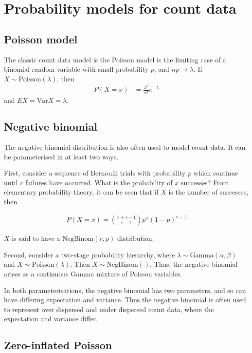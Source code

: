 \documentclass{amsart}
\begin{document}
\section{Probability models for count data}
\subsection{Poisson model}
The classic count data model is the Poisson model is the limiting case of a binomial 
random variable with small  probability $p$, and $np \to \lambda$. If $X \sim 
\text{Poisson}(\lambda)$, then
\begin{align*}
P(X=x) &= \frac{\lambda^x}{x!} e^{-\lambda}
\end{align*}
and $EX = \text{Var}X = \lambda$.

\subsection{Negative binomial}

The negative binomial distribution is also often used to model count data. It can
be parameterised in at least two ways.

First, consider a sequence of Bernoulli trials with probability $p$ which continue
until $r$ failures have occurred. What is the probability of $x$ successes? From
elementary probability theory, it can be seen that if $X$ is the number of successes,
then

\begin{align*}
P(X=x) = {x + r - 1 \choose r - 1} p^x (1-p)^{r-1}
\end{align*}

$X$ is said to have a $\text{NegBinom}(r, p)$ distribution.

Second, consider a two-stage probability hierarchy, where $\lambda \sim
\text{Gamma}(\alpha, \beta)$ and $X \sim \text{Poisson}(\lambda)$. Then
$X \sim \text{NegBinom}()$. Thus, the negative binomial arises as a continuous
Gamma mixture of Poisson variables.

In both parameterisations, the negative binomial has two parameters, and so can have
differing expectation and variance. Thus the negative binomial is often used to
represent over dispersed and under dispersed count data, where the expectation and
variance differ.

\subsection{Zero-inflated Poisson}
\end{document}
